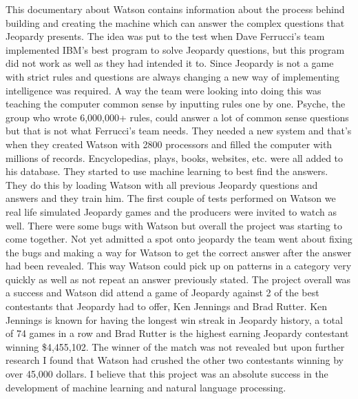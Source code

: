 \documentclass[a4paper, 11pt]{article}
\begin{document}
This documentary about Watson contains information about the process behind building and creating the machine which can answer the complex questions that Jeopardy presents. The idea was put to the test when Dave Ferrucci's team implemented IBM's best program to solve Jeopardy questions, but this program did not work as well as they had intended it to. Since Jeopardy is not a game with strict rules and questions are always changing a new way of implementing intelligence was required. A way the team were looking into doing this was teaching the computer common sense by inputting rules one by one. Psyche, the group who wrote 6,000,000+ rules, could answer a lot of common sense questions but that is not what Ferrucci's team needs. They needed a new system and that's when they created Watson with 2800 processors and filled the computer with millions of records. Encyclopedias, plays, books, websites, etc. were all added to his database. They started to use machine learning to best find the answers. They do this by loading Watson with all previous Jeopardy questions and answers and they train him. The first couple of tests performed on Watson we real life simulated Jeopardy games and the producers were invited to watch as well. There were some bugs with Watson but overall the project was starting to come together. Not yet admitted a spot onto jeopardy the team went about fixing the bugs and making a way for Watson to get the correct answer after the answer had been revealed. This way Watson could pick up on patterns in a category very quickly as well as not repeat an answer previously stated. The project overall was a success and Watson did attend a game of Jeopardy against 2 of the best contestants that Jeopardy had to offer, Ken Jennings and Brad Rutter. Ken Jennings is known for having the longest win streak in Jeopardy history, a total of 74 games in a row and Brad Rutter is the highest earning Jeopardy contestant winning \$4,455,102. The winner of the match was not revealed but upon further research I found that Watson had crushed the other two contestants winning by over 45,000 dollars. I believe that this project was an absolute success in the development of machine learning and natural language processing.
\end{document}
